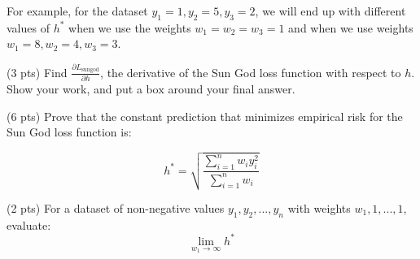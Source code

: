 \documentclass[twoside,12pt]{article}
\begin{document}
\begin{probset}
\begin{prob}[(11 pts)]
\vspace{0.1in}

For example, for the dataset $y_1 = 1, y_2 = 5, y_3 = 2$, we will end up with different values of $h^*$ when we use the weights $w_1 = w_2 = w_3 = 1$ and when we use weights $w_1 = 8, w_2 = 4, w_3 = 3$.

\begin{subprobset}

\begin{subprob}(3 pts) Find $\frac{\partial L_\text{sungod}}{\partial h}$, the derivative of the Sun God loss function with respect to $h$. Show your work, and put a $\boxed{\text{box}}$ around your final answer.

\begin{responsebox}{3in}

\end{responsebox}
    
\end{subprob}

\newpage

\begin{subprob}(6 pts) Prove that the constant prediction that minimizes empirical risk for the Sun God loss function is:

$$h^* = \sqrt{\frac{\sum_{i = 1}^n w_i y_i^2}{\sum_{i = 1}^n w_i}}$$


\begin{responsebox}{5in}

\end{responsebox}
    
\end{subprob}

\begin{subprob}(2 pts) For a dataset of non-negative values $y_1, y_2, ..., y_n$ with weights $w_1, 1, ..., 1$, evaluate: $$\displaystyle \lim_{w_1 \rightarrow \infty} h^*$$





\end{subprob}
\end{subprobset}
\end{prob}
\end{probset}
\end{document}
